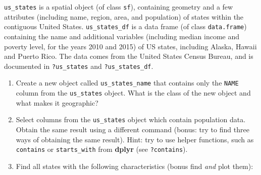 \documentclass[]{krantz}
\providecommand{\tightlist}{%
  \setlength{\itemsep}{0pt}\setlength{\parskip}{0pt}}
\begin{document}
\texttt{us\_states} is a spatial object (of class \texttt{sf}), containing geometry and a few attributes (including name, region, area, and population) of states within the contiguous United States.
\texttt{us\_states\_df} is a data frame (of class \texttt{data.frame}) containing the name and additional variables (including median income and poverty level, for the years 2010 and 2015) of US states, including Alaska, Hawaii and Puerto Rico.
The data comes from the United States Census Bureau, and is documented in \texttt{?us\_states} and \texttt{?us\_states\_df}.

\begin{enumerate}
\def\labelenumi{\arabic{enumi}.}
\tightlist
\item
  Create a new object called \texttt{us\_states\_name} that contains only the \texttt{NAME} column from the \texttt{us\_states} object.
  What is the class of the new object and what makes it geographic? 
\item
  Select columns from the \texttt{us\_states} object which contain population data.
  Obtain the same result using a different command (bonus: try to find three ways of obtaining the same result).
  Hint: try to use helper functions, such as \texttt{contains} or \texttt{starts\_with} from \textbf{dplyr} (see \texttt{?contains}).
\item
  Find all states with the following characteristics (bonus find \emph{and} plot them):


\end{enumerate}
\end{document}
